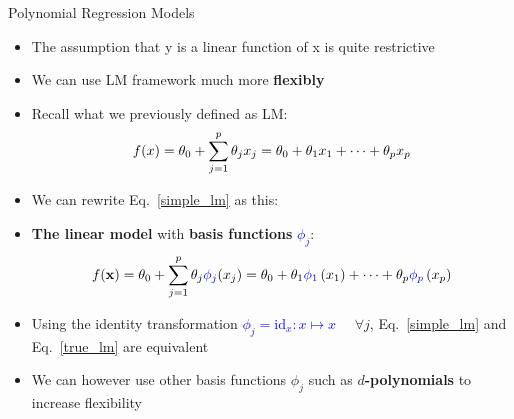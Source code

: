 \documentclass[11pt,compress,t,notes=noshow, xcolor=table]{beamer}
\begin{document}

\begin{vbframe}{Polynomial Regression Models}

\begin{itemize}
    \item The assumption that y is a linear function of x is quite restrictive
    \item We can use LM framework much more \textbf{flexibly}
    \item Recall what we previously defined as LM:
    \begin{equation} \label{simple_lm}
      f(x) = \theta_0 + \sum\limits_{j=1}^p \theta_j x_j =
      \theta_0 + \theta_1 x_1 + \dots + \theta_p x_p
    \end{equation}
    \item We can rewrite Eq.~\ref{simple_lm} as this:
    \item \textbf{The linear model} with \textbf{basis functions}
    \textcolor{blue}{$\phi_j$}:
    \begin{equation*} \label{true_lm}
      f(\mathbf{x}) = \theta_0 + \sum\limits_{j=1}^p \theta_j \textcolor{blue}{\phi_j} (x_j)
      = \theta_0 + \theta_1  \textcolor{blue}{\phi_1} \left( x_1 \right)
      + \dots + \theta_p \textcolor{blue}{\phi_p} \left(x_p \right)
    \end{equation*}
    \item Using the identity transformation \textcolor{blue}{$\phi_j = \text{id}_x: x \mapsto x$}~~ $\forall j$, Eq.~\ref{simple_lm} and Eq.~\ref{true_lm} are equivalent
    \item We can however use other basis functions $\phi_j$ such as \textbf{$d$-polynomials} to increase flexibility

\end{itemize}

\end{vbframe}



\endlecture
\end{document}
